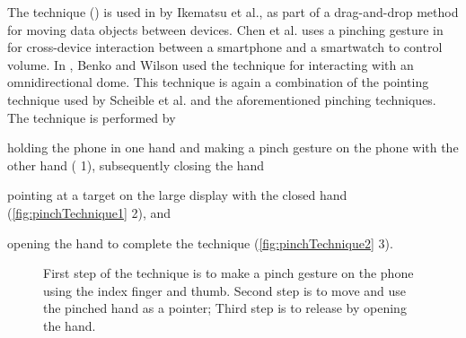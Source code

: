 The \pinch technique () is used in \cite{Ikematsu:2015} by Ikematsu et al., as part of a drag-and-drop method for moving data objects between devices.
Chen et al. uses a pinching gesture in \cite{Chen:2014} for cross-device interaction between a smartphone and a smartwatch to control volume. 
In \cite{Benko:2010}, Benko and Wilson used the \pinch technique for interacting with an omnidirectional dome.
This technique is again a combination of the pointing technique used by Scheible et al. and the aforementioned pinching techniques. 
The \pinch technique is performed by 
\begin{enumerate*}[label=\itshape\roman*\upshape)]
	\item{holding the phone in one hand and making a pinch gesture on the phone with the other hand ( 1), subsequently closing the hand}
	\item{pointing at a target on the large display with the closed hand (\cref{fig:pinchTechnique1} 2), and}
	\item{opening the hand to complete the technique (\cref{fig:pinchTechnique2} 3).}
\end{enumerate*}

\begin{figure}[H]
\hspace{0.02\columnwidth}  
\caption{
	\protect{} First step of the \pinch technique is to make a pinch gesture on the phone using the index finger and thumb. Second step is to move and use the pinched hand as a pointer; 
	\protect{} Third step is to release by opening the hand. 
}
\label{fig:pinchTechnique}
\end{figure}

